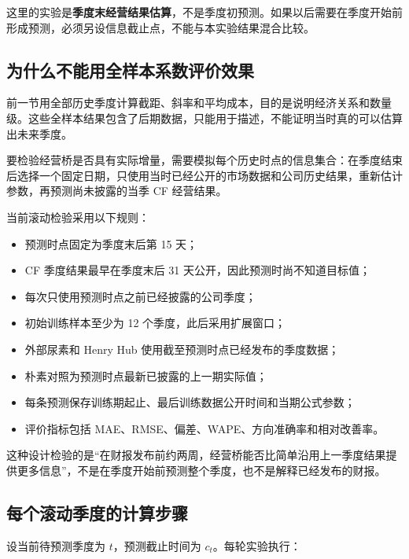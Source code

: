 \documentclass[11pt,a4paper]{ctexart}
\begin{document}
这里的实验是\textbf{季度末经营结果估算}，不是季度初预测。如果以后需要在季度开始前形成预测，必须另设信息截止点，不能与本实验结果混合比较。

\subsection{为什么不能用全样本系数评价效果}

前一节用全部历史季度计算截距、斜率和平均成本，目的是说明经济关系和数量级。这些全样本结果包含了后期数据，只能用于描述，不能证明当时真的可以估算出未来季度。

要检验经营桥是否具有实际增量，需要模拟每个历史时点的信息集合：在季度结束后选择一个固定日期，只使用当时已经公开的市场数据和公司历史结果，重新估计参数，再预测尚未披露的当季 CF 经营结果。

当前滚动检验采用以下规则：

\begin{itemize}
  \item 预测时点固定为季度末后第 15 天；
  \item CF 季度结果最早在季度末后 31 天公开，因此预测时尚不知道目标值；
  \item 每次只使用预测时点之前已经披露的公司季度；
  \item 初始训练样本至少为 12 个季度，此后采用扩展窗口；
  \item 外部尿素和 Henry Hub 使用截至预测时点已经发布的季度数据；
  \item 朴素对照为预测时点最新已披露的上一期实际值；
  \item 每条预测保存训练期起止、最后训练数据公开时间和当期公式参数；
  \item 评价指标包括 MAE、RMSE、偏差、WAPE、方向准确率和相对改善率。
\end{itemize}

这种设计检验的是“在财报发布前约两周，经营桥能否比简单沿用上一季度结果提供更多信息”，不是在季度开始前预测整个季度，也不是解释已经发布的财报。

\subsection{每个滚动季度的计算步骤}

设当前待预测季度为 $t$，预测截止时间为 $c_t$。每轮实验执行：
\end{document}
